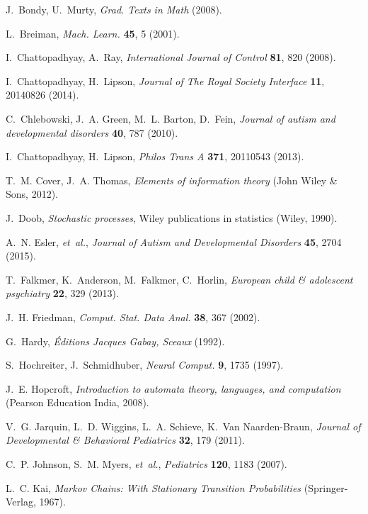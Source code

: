 \documentclass[onecolumn,,10pt]{IEEEtran}
\begin{document}
\begin{thebibliography}{10}
J.~Bondy, U.~Murty, {\it Grad. Texts in Math\/}  (2008).

L.~Breiman, {\it Mach. Learn.\/} {\bf 45}, 5 (2001).

I.~Chattopadhyay, A.~Ray, {\it International Journal of Control\/} {\bf 81},
  820 (2008).

I.~Chattopadhyay, H.~Lipson, {\it Journal of The Royal Society Interface\/}
  {\bf 11}, 20140826 (2014).

C.~Chlebowski, J.~A. Green, M.~L. Barton, D.~Fein, {\it Journal of autism and
  developmental disorders\/} {\bf 40}, 787 (2010).

I.~Chattopadhyay, H.~Lipson, {\it Philos Trans A\/} {\bf 371}, 20110543 (2013).

T.~M. Cover, J.~A. Thomas, {\it Elements of information theory\/} (John Wiley
  \& Sons, 2012).

J.~Doob, {\it Stochastic processes\/}, Wiley publications in statistics (Wiley,
  1990).

A.~N. Esler, {\it et~al.\/}, {\it Journal of Autism and Developmental
  Disorders\/} {\bf 45}, 2704 (2015).

T.~Falkmer, K.~Anderson, M.~Falkmer, C.~Horlin, {\it European child \&
  adolescent psychiatry\/} {\bf 22}, 329 (2013).

J.~H. Friedman, {\it Comput. Stat. Data Anal.\/} {\bf 38}, 367 (2002).

G.~Hardy, {\it {\'E}ditions Jacques Gabay, Sceaux\/}  (1992).

S.~Hochreiter, J.~Schmidhuber, {\it Neural Comput.\/} {\bf 9}, 1735 (1997).

J.~E. Hopcroft, {\it Introduction to automata theory, languages, and
  computation\/} (Pearson Education India, 2008).

V.~G. Jarquin, L.~D. Wiggins, L.~A. Schieve, K.~Van Naarden-Braun, {\it Journal
  of Developmental \& Behavioral Pediatrics\/} {\bf 32}, 179 (2011).

C.~P. Johnson, S.~M. Myers, {\it et~al.\/}, {\it Pediatrics\/} {\bf 120}, 1183
  (2007).

L.~C. Kai, {\it Markov Chains: With Stationary Transition Probabilities\/}
  (Springer-Verlag, 1967).


\end{thebibliography}
\end{document}
